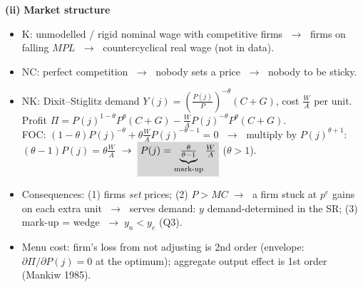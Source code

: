 \documentclass[11pt, a4paper]{article}
\newcommand{\res}[1]{\colorbox{hl}{$\displaystyle #1$}}
\newcommand{\rest}[1]{\colorbox{hl}{#1}}
\newcommand{\itm}[1]{\par\smallskip\needspace{3\baselineskip}\noindent\textbf{(#1)}\quad}
\newcommand{\ra}{\;\rightarrow\;}
\begin{document}
\itm{ii} \textbf{Market structure}
\begin{itemize}
\item K: unmodelled / rigid nominal wage with competitive firms $\ra$ firms on falling $MPL$
      $\ra$ countercyclical real wage (not in data).
\item NC: perfect competition $\ra$ nobody sets a price $\ra$ nobody to be sticky.
\item NK: Dixit--Stiglitz demand $Y(j)=\left(\tfrac{P(j)}{P}\right)^{-\theta}(C+G)$, cost $\tfrac WA$ per unit.
      Profit $\Pi=P(j)^{1-\theta}P^{\theta}(C+G)-\tfrac WA P(j)^{-\theta}P^{\theta}(C+G)$.\\
      FOC: $(1-\theta)P(j)^{-\theta}+\theta\tfrac WA P(j)^{-\theta-1}=0$
      $\ra$ multiply by $P(j)^{\theta+1}$: $(\theta-1)P(j)=\theta\tfrac WA$
      $\ra\res{P(j)=\underbrace{\tfrac{\theta}{\theta-1}}_{\text{mark-up}}\tfrac WA}$ \;($\theta>1$).
\item Consequences: (1) firms \emph{set} prices; (2) $P>MC\ra$ a firm stuck at $p^e$ gains on
      each extra unit $\ra$ \rest{serves demand: $y$ demand-determined in the SR};
      (3) mark-up = wedge $\ra y_n<y_e$ (Q3).
\item Menu cost: firm's loss from not adjusting is 2nd order (envelope: $\partial\Pi/\partial P(j)=0$
      at the optimum); aggregate output effect is 1st order (Mankiw 1985).
\end{itemize}
\end{document}
